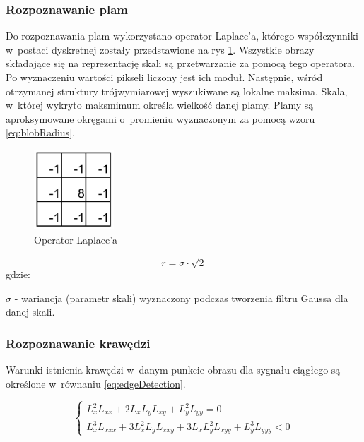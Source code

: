 \subsubsection{Rozpoznawanie plam}
\label{subsubsec:rozpoznawaniePlam}

Do rozpoznawania plam wykorzystano operator Laplace'a, którego współczynniki w~postaci dyskretnej zostały przedstawione na rys \ref{fig:laplacian_kernel}. Wszystkie obrazy składające się na reprezentację skali są przetwarzanie za pomocą tego operatora. Po wyznaczeniu wartości pikseli liczony jest ich moduł. Następnie, wśród otrzymanej struktury trójwymiarowej wyszukiwane są lokalne maksima. Skala, w~której wykryto maksmimum określa wielkość danej plamy. Plamy są aproksymowane okręgami o~promieniu wyznaczonym za pomocą wzoru \ref{eq:blobRadius}.

\begin{figure}
\begin{center}
\includegraphics[width=3cm]{laplacian.pdf}
\end{center}
\caption{Operator Laplace'a}
\label{fig:laplacian_kernel}
\end{figure}

\begin{equation}
\label{eq:blobRadius}
r = \sigma \cdot \sqrt{2}
\end{equation}
gdzie:

$ \sigma $ - wariancja (parametr skali) wyznaczony podczas tworzenia filtru Gaussa dla danej skali.

\subsubsection{Rozpoznawanie krawędzi}
\label{subsubsec:rozpoznawanieKrawedzi}

Warunki istnienia krawędzi w~danym punkcie obrazu dla sygnału ciągłego są określone w~równaniu \ref{eq:edgeDetection}.

\begin{equation}
\label{eq:edgeDetection}
\left\{ \begin{array}{rl}
L_x^2 L_{xx} + 2L_xL_yL_{xy} + L_y^2L_{yy} = 0 \\
L_x^3L_{xxx} + 3L_x^2L_yL_{xxy} + 3L_xL_y^2L_{xyy} + L_y^3L_{yyy} < 0
\end{array} \right.
\end{equation}

